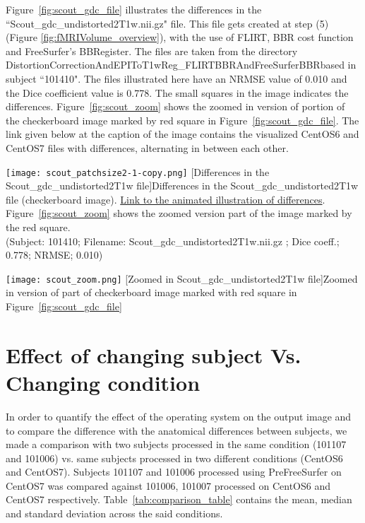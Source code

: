 Figure~\ref{fig:scout_gdc_file} illustrates the differences in the ``Scout\_gdc\_undistorted2T1w.nii.gz" file. This file gets created at step (5) (Figure \ref{fig:fMRIVolume_overview}), with the use of FLIRT, BBR cost function and FreeSurfer's BBRegister. The files are taken from the directory DistortionCorrectionAndEPIToT1wReg\_FLIRTBBRAndFreeSurferBBRbased in subject ``101410". The files illustrated here have an NRMSE value of 0.010 and the Dice coefficient value is 0.778. The small squares in the image indicates the differences. Figure~\ref{fig:scout_zoom} shows the zoomed in version of portion of the checkerboard image marked by red square in Figure~\ref{fig:scout_gdc_file}. The link given below at the caption of the image contains the visualized CentOS6 and CentOS7 files with differences, alternating in between each other.

\begin{center}
\texttt{[image: scout\_patchsize2-1-copy.png]}%
[Differences in the Scout\_gdc\_undistorted2T1w file]{Differences in the Scout\_gdc\_undistorted2T1w file (checkerboard image). \href{https://drive.google.com/file/d/1iRP6jVMKbGBLjLdEi3l5j4Q8Pngp5Nln/view?usp=sharing}{Link to the animated illustration of differences}.\\Figure~\ref{fig:scout_zoom} shows the zoomed version part of the image marked by the red square.\\(Subject: 101410; Filename: Scout\_gdc\_undistorted2T1w.nii.gz ; Dice coeff.; 0.778; NRMSE; 0.010)}
\label{fig:scout_gdc_file}
\end{center}

\begin{center}
\texttt{[image: scout\_zoom.png]}%
[Zoomed in Scout\_gdc\_undistorted2T1w file]{Zoomed in version of part of checkerboard image marked with red square in Figure~\ref{fig:scout_gdc_file}}
\label{fig:scout_zoom}
\end{center}

\section{Effect of changing subject Vs. Changing condition}\label{sec:comparison}
In order to quantify the effect of the operating system on the output image and to compare the difference with the anatomical differences between subjects, we made a comparison with two subjects processed in the same condition (101107 and 101006) vs. same subjects processed in two different conditions (CentOS6 and CentOS7). Subjects 101107 and 101006 processed using PreFreeSurfer on CentOS7 was compared against 101006, 101007 processed on CentOS6 and CentOS7 respectively. Table~\ref{tab:comparison_table} contains the mean, median and standard deviation across the said conditions.

